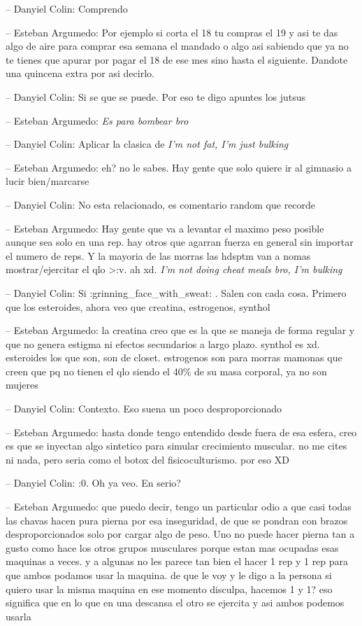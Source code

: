 -- Danyiel Colin: Comprendo

-- Esteban Argumedo: Por ejemplo si corta el 18 tu compras el 19 y asi
te das algo de aire para comprar esa semana el mandado o algo asi
sabiendo que ya no te tienes que apurar por pagar el 18 de ese mes sino
hasta el siguiente. Dandote una quincena extra por asi decirlo.

-- Danyiel Colin: Si se que se puede. Por eso te digo apuntes los jutsus

-- Esteban Argumedo: \emph{Es para bombear bro}

-- Danyiel Colin: Aplicar la clasica de \emph{I'm not fat, I'm just
bulking}

-- Esteban Argumedo: eh? no le sabes. Hay gente que solo quiere ir al
gimnasio a lucir bien/marcarse

-- Danyiel Colin: No esta relacionado, es comentario random que recorde

-- Esteban Argumedo: Hay gente que va a levantar el maximo peso posible
aunque sea solo en una rep. hay otros que agarran fuerza en general sin
importar el numero de reps. Y la mayoria de las morras las hdsptm van a
nomas mostrar/ejercitar el qlo \textgreater:v. ah xd. \emph{I'm not
doing cheat meals bro, I'm bulking}

-- Danyiel Colin: Si :grinning\_face\_with\_sweat: . Salen con cada
cosa. Primero que los esteroides, ahora veo que creatina, estrogenos,
synthol

-- Esteban Argumedo: la creatina creo que es la que se maneja de forma
regular y que no genera estigma ni efectos secundarios a largo plazo.
synthol es xd. esteroides los que son, son de closet. estrogenos son
para morras mamonas que creen que pq no tienen el qlo siendo el 40\% de
su masa corporal, ya no son mujeres

-- Danyiel Colin: Contexto. Eso suena un poco desproporcionado

-- Esteban Argumedo: hasta donde tengo entendido desde fuera de esa
esfera, creo es que se inyectan algo sintetico para simular crecimiento
muscular. no me cites ni nada, pero seria como el botox del
fisicoculturismo. por eso XD

-- Danyiel Colin: :0. Oh ya veo. En serio?

-- Esteban Argumedo: que puedo decir, tengo un particular odio a que
casi todas las chavas hacen pura pierna por esa inseguridad, de que se
pondran con brazos desproporcionados solo por cargar algo de peso. Uno
no puede hacer pierna tan a gusto como hace los otros grupos musculares
porque estan mas ocupadas esas maquinas a veces. y a algunas no les
parece tan bien el hacer 1 rep y 1 rep para que ambos podamos usar la
maquina. de que le voy y le digo a la persona si quiero usar la misma
maquina en ese momento disculpa, hacemos 1 y 1? eso significa que en lo
que en una descansa el otro se ejercita y asi ambos podemos usarla

